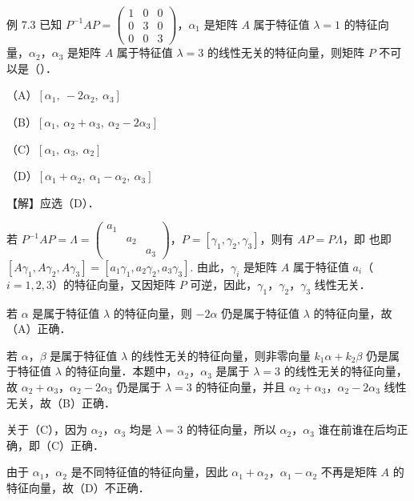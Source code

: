 \begin{fcard}{例 7.3}
已知 $P^{-1}AP=\begin{pmatrix}1&0&0\\0&3&0\\0&0&3\end{pmatrix}$，$\alpha_1$ 是矩阵 $A$ 属于特征值 $\lambda=1$ 的特征向量，$\alpha_2$，$\alpha_3$ 是矩阵 $A$ 属于特征值 $\lambda=3$ 的线性无关的特征向量，则矩阵 $P$ 不可以是（\quad）．

（A）$[\alpha_1,\ -2\alpha_2,\ \alpha_3]$

（B）$[\alpha_1,\ \alpha_2+\alpha_3,\ \alpha_2-2\alpha_3]$

（C）$[\alpha_1,\ \alpha_3,\ \alpha_2]$

（D）$[\alpha_1+\alpha_2,\ \alpha_1-\alpha_2,\ \alpha_3]$

【解】应选（D）．

若 $P^{-1}AP=\Lambda=\begin{pmatrix}a_1&&\\&a_2&\\&&a_3\end{pmatrix}$，$P=[\gamma_1,\gamma_2,\gamma_3]$，则有 $AP=P\Lambda$，即
也即 $[A\gamma_1,A\gamma_2,A\gamma_3]=[a_1\gamma_1,a_2\gamma_2,a_3\gamma_3]$. 由此，$\gamma_i$ 是矩阵 $A$ 属于特征值 $a_i$（$i=1,2,3$）的特征向量，又因矩阵 $P$ 可逆，因此，$\gamma_1$，$\gamma_2$，$\gamma_3$ 线性无关．

若 $\alpha$ 是属于特征值 $\lambda$ 的特征向量，则 $-2\alpha$ 仍是属于特征值 $\lambda$ 的特征向量，故（A）正确．

若 $\alpha$，$\beta$ 是属于特征值 $\lambda$ 的线性无关的特征向量，则非零向量 $k_1\alpha+k_2\beta$ 仍是属于特征值 $\lambda$ 的特征向量．本题中，$\alpha_2$，$\alpha_3$ 是属于 $\lambda=3$ 的线性无关的特征向量，故 $\alpha_2+\alpha_3$，$\alpha_2-2\alpha_3$ 仍是属于 $\lambda=3$ 的特征向量，并且 $\alpha_2+\alpha_3$，$\alpha_2-2\alpha_3$ 线性无关，故（B）正确．

关于（C），因为 $\alpha_2$，$\alpha_3$ 均是 $\lambda=3$ 的特征向量，所以 $\alpha_2$，$\alpha_3$ 谁在前谁在后均正确，即（C）正确．

由于 $\alpha_1$，$\alpha_2$ 是不同特征值的特征向量，因此 $\alpha_1+\alpha_2$，$\alpha_1-\alpha_2$ 不再是矩阵 $A$ 的特征向量，故（D）不正确．
\end{fcard}

